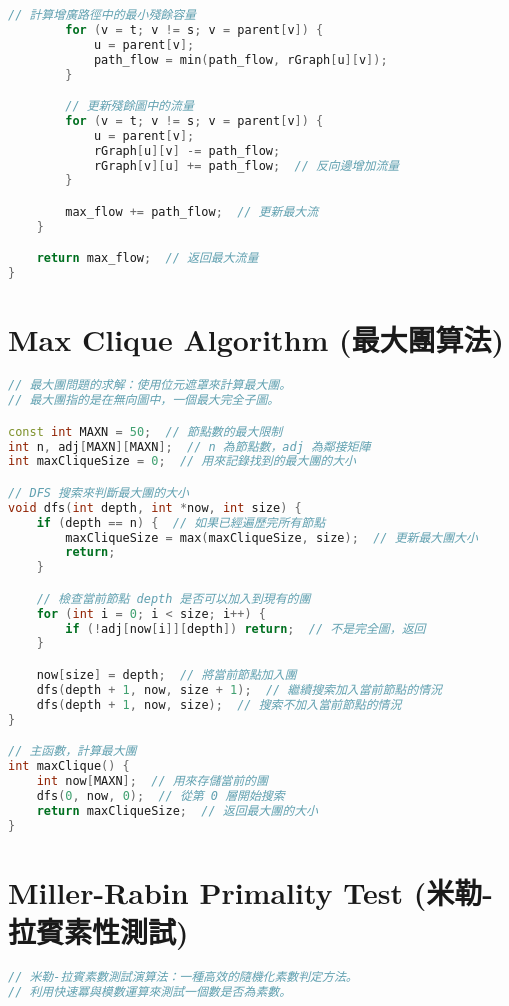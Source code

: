 \documentclass{article}
\begin{document}
\begin{multicols}{2}
\begin{lstlisting}[language=C++]
        // 計算增廣路徑中的最小殘餘容量
        for (v = t; v != s; v = parent[v]) {
            u = parent[v];
            path_flow = min(path_flow, rGraph[u][v]);
        }

        // 更新殘餘圖中的流量
        for (v = t; v != s; v = parent[v]) {
            u = parent[v];
            rGraph[u][v] -= path_flow;
            rGraph[v][u] += path_flow;  // 反向邊增加流量
        }

        max_flow += path_flow;  // 更新最大流
    }

    return max_flow;  // 返回最大流量
}
\end{lstlisting}

\section{Max Clique Algorithm (最大團算法)}

\begin{lstlisting}[language=C++]
// 最大團問題的求解：使用位元遮罩來計算最大團。
// 最大團指的是在無向圖中，一個最大完全子圖。

const int MAXN = 50;  // 節點數的最大限制
int n, adj[MAXN][MAXN];  // n 為節點數，adj 為鄰接矩陣
int maxCliqueSize = 0;  // 用來記錄找到的最大團的大小

// DFS 搜索來判斷最大團的大小
void dfs(int depth, int *now, int size) {
    if (depth == n) {  // 如果已經遍歷完所有節點
        maxCliqueSize = max(maxCliqueSize, size);  // 更新最大團大小
        return;
    }

    // 檢查當前節點 depth 是否可以加入到現有的團
    for (int i = 0; i < size; i++) {
        if (!adj[now[i]][depth]) return;  // 不是完全圖，返回
    }

    now[size] = depth;  // 將當前節點加入團
    dfs(depth + 1, now, size + 1);  // 繼續搜索加入當前節點的情況
    dfs(depth + 1, now, size);  // 搜索不加入當前節點的情況
}

// 主函數，計算最大團
int maxClique() {
    int now[MAXN];  // 用來存儲當前的團
    dfs(0, now, 0);  // 從第 0 層開始搜索
    return maxCliqueSize;  // 返回最大團的大小
}
\end{lstlisting}

\section{Miller-Rabin Primality Test (米勒-拉賓素性測試)}

\begin{lstlisting}[language=C++]
// 米勒-拉賓素數測試演算法：一種高效的隨機化素數判定方法。
// 利用快速冪與模數運算來測試一個數是否為素數。


\end{lstlisting}
\end{multicols}
\end{document}
